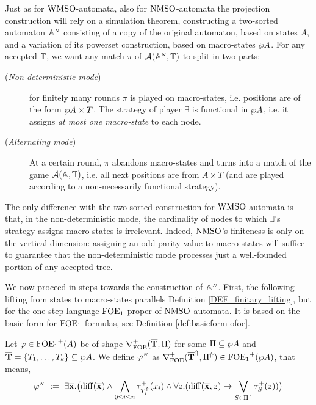 Just as for $\mathrm{WMSO}$-automata, also for $\mathrm{NMSO}$-automata the projection construction will rely on a simulation theorem, constructing a two-sorted automaton $\mathbb{A}^{{\scriptscriptstyle N}}$ consisting of a copy of the original automaton, based on states $A$, and a variation of its powerset construction, based on macro-states $\wp A$. For any accepted $\mathbb{T}$, we want any match $\pi$ of $\mathcal{A}(\mathbb{A}^{{\scriptscriptstyle N}},\mathbb{T})$ to split in two parts:
\begin{description}
  \item[(\textit{Non-deterministic mode})] for finitely many rounds $\pi$ is played on macro-states, i.e. positions are of the form $\wp A \times T$. The strategy of player $\exists$ is functional in $\wp A$, i.e. it assigns \emph{at most one macro-state} to each node.
  \item[(\textit{Alternating mode})] At a certain round, $\pi$ abandons macro-states and turns into a match of the game $\mathcal{A}(\mathbb{A},\mathbb{T})$, i.e. all next positions are from $A \times T$ (and are played according to a non-necessarily functional strategy). %
\end{description}
The only difference with the two-sorted construction for $\mathrm{WMSO}$-automata is that, in the non-deterministic mode, the cardinality of nodes to which $\exists$'s strategy assigns macro-states is irrelevant. Indeed, $\mathrm{NMSO}$'s finiteness is only on the vertical dimension: assigning an odd parity value to macro-states will suffice to guarantee that the non-deterministic mode processes just a well-founded portion of any accepted tree.

We now proceed in steps towards the construction of $\mathbb{A}^{{\scriptscriptstyle N}}$. First, the following lifting from states to macro-states parallels Definition \ref{DEF_finitary_lifting}, but for the one-step language $\mathrm{FOE}_1$ proper of $\mathrm{NMSO}$-automata. It is based on the basic form for $\mathrm{FOE}_1$-formulas, see Definition \ref{def:basicform-ofoe}.

\begin{definition}\label{DEF_noetherian_lifting}
Let $\varphi \in {\ensuremath{\mathrm{FOE}_1}}^+(A)$ be of shape $\nabla^+_{\mathrm{FOE}}(\overline{{\mathbf{T}}},\Pi)$ for some $\Pi \subseteq \wp A$ and $\overline{{\mathbf{T}}} = \{T_1,\dots,T_k\} \subseteq \wp A$. We define $\varphi^{{\scriptscriptstyle N}}$ as $\nabla^+_{\mathrm{FOE}}(\overline{{\mathbf{T}}}^{\Uparrow},\Pi^{\Uparrow}) \in {\ensuremath{\mathrm{FOE}_1}}^+(\wp A )$, that means,
\begin{equation}\label{eq:unfoldingNablaofoe}
\varphi^{\noet} \ \df \
    \exists \vlist{x}.\big(\arediff{\vlist{x}} \land \bigwedge_{0 \leq i \leq n} \tau^+_{\lift{T}_i}(x_i)
\land
    \forall z.(\arediff{\vlist{x},z} \lthen \bigvee_{S\in \lift{\Pi} } \tau^+_S(z))\big)
\end{equation}
\end{definition}

